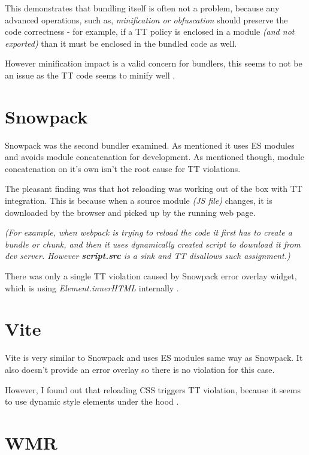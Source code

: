 This demonstrates that bundling itself is often not a problem, because any advanced operations, such
as, \emph{minification or obfuscation} should preserve the code correctness - for example, if a TT
policy is enclosed in a module \emph{(and not exported)} than it must be enclosed in the bundled
code as well.

However minification impact is a valid concern for bundlers, this seems to not be an issue as the TT
code seems to minify well \cite{tt_webpack_integration_minification}.

\section{Snowpack}

Snowpack was the second bundler examined. As mentioned it uses ES modules and avoids module
concatenation for development. As mentioned though, module concatenation on it's own isn't the root
cause for TT violations.

The pleasant finding was that hot reloading was working out of the box with TT integration. This is
because when a source module \emph{(JS file)} changes, it is downloaded by the browser and picked up
by the running web page.

\emph{(For example, when webpack is trying to reload the code it first has to create a bundle or
  chunk, and then it uses dynamically created script to download it from dev server. However
  \textbf{script.src} is a sink and TT disallows such assignment.)}

There was only a single TT violation caused by Snowpack error overlay widget, which is using
\emph{Element.innerHTML} internally \cite{snowpack_violation}.

\section{Vite}

Vite is very similar to Snowpack and uses ES modules same way as Snowpack. It also doesn't provide
an error overlay so there is no violation for this case.

However, I found out that reloading CSS triggers TT violation, because it seems to use dynamic style
elements under the hood \cite{vite_violation}.

\section{WMR}

